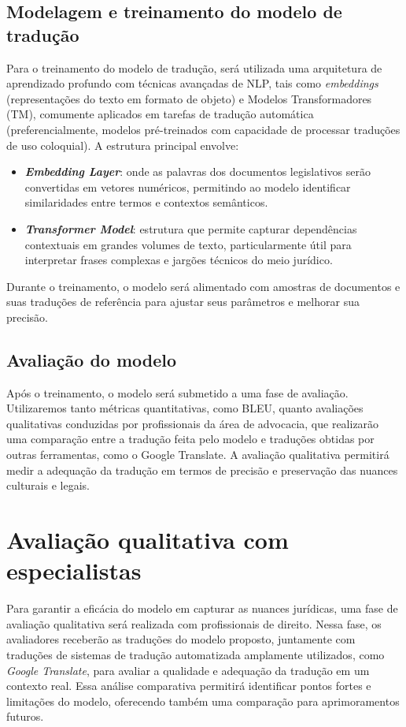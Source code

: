 \subsection{Modelagem e treinamento do modelo de tradução}

Para o treinamento do modelo de tradução, será utilizada uma arquitetura de aprendizado profundo com técnicas avançadas de NLP, tais como \textit{embeddings} (representações do texto em formato de objeto) e Modelos Transformadores (TM), comumente aplicados em tarefas de tradução automática (preferencialmente, modelos pré-treinados com capacidade de processar traduções de uso coloquial). A estrutura principal envolve:

\begin{itemize}
    \item \textbf{\textit{Embedding Layer}}: onde as palavras dos documentos legislativos serão convertidas em vetores numéricos, permitindo ao modelo identificar similaridades entre termos e contextos semânticos.
    \item \textbf{\textit{Transformer Model}}: estrutura que permite capturar dependências contextuais em grandes volumes de texto, particularmente útil para interpretar frases complexas e jargões técnicos do meio jurídico.
\end{itemize}

Durante o treinamento, o modelo será alimentado com amostras de documentos e suas traduções de referência para ajustar seus parâmetros e melhorar sua precisão.

\subsection{Avaliação do modelo}

Após o treinamento, o modelo será submetido a uma fase de avaliação. Utilizaremos tanto métricas quantitativas, como BLEU, quanto avaliações qualitativas conduzidas por profissionais da área de advocacia, que realizarão uma comparação entre a tradução feita pelo modelo e traduções obtidas por outras ferramentas, como o Google Translate. A avaliação qualitativa permitirá medir a adequação da tradução em termos de precisão e preservação das nuances culturais e legais.

\section{Avaliação qualitativa com especialistas}

Para garantir a eficácia do modelo em capturar as nuances jurídicas, uma fase de avaliação qualitativa será realizada com profissionais de direito. Nessa fase, os avaliadores receberão as traduções do modelo proposto, juntamente com traduções de sistemas de tradução automatizada amplamente utilizados, como \textit{Google Translate}, para avaliar a qualidade e adequação da tradução em um contexto real. Essa análise comparativa permitirá identificar pontos fortes e limitações do modelo, oferecendo também uma comparação para aprimoramentos futuros.

